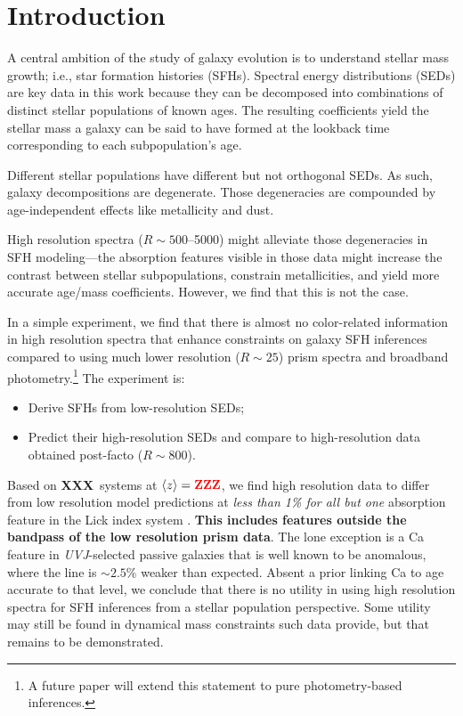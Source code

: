\documentclass[a4paper,fleqn,usenatbib]{mnras}
\newcommand{\bfr}{\bf\color{red}}
\newcommand{\ntot}{{\bfr XXX}} %
\newcommand{\midz}{{\bfr ZZZ}} %
\begin{document}

\section{Introduction}
\label{sec:intro}

A central ambition of the study of galaxy evolution is to understand stellar mass growth; i.e., 
star formation histories (SFHs). Spectral energy distributions (SEDs) are key data in this work because 
they can be decomposed into combinations of distinct stellar populations of known ages. The resulting 
coefficients yield the stellar mass a galaxy can be said to have formed at the lookback time 
corresponding to each subpopulation's age.
	
Different stellar populations have different but not orthogonal SEDs. As such, galaxy decompositions 
are degenerate. Those degeneracies are compounded by age-independent effects like metallicity 
and dust. 

High resolution spectra ($R\sim500$--5000) might alleviate those degeneracies 
in SFH modeling---the absorption features visible in those data might increase the contrast 
between stellar subpopulations, constrain metallicities, and yield more accurate 
age/mass coefficients. However, we find that this is not the case.

In a simple experiment, we find that there is almost no color-related information in high resolution 
spectra that enhance constraints on galaxy SFH inferences compared to using much lower
resolution ($R\sim25$) prism spectra and broadband photometry.\footnote{A future paper will 
extend this statement to pure photometry-based inferences.} The experiment is:
\begin{itemize}
	\item Derive SFHs from low-resolution SEDs;
	\item Predict their high-resolution SEDs and compare to high-resolution data obtained 
		post-facto ($R\sim800$).
\end{itemize}

Based on \ntot\ systems at $\langle z\rangle=\midz$, we find high resolution data to differ from 
low resolution model predictions at {\it less than 1\% for all but one} absorption feature in the 
Lick index system \citep{Worthey94}. {\bfr This includes features outside the bandpass of the 
low resolution prism data}. The lone exception is a Ca feature in {\it UVJ}-selected passive 
galaxies \citep{Williams09} that is well known to be anomalous, where the line is $\sim2.5\%$ 
weaker than expected. Absent a prior linking Ca to age accurate to that level, we conclude that there
is no utility in using high resolution spectra for SFH inferences from a stellar population perspective. 
Some utility may still be found in dynamical mass constraints such data provide, but that remains to be
demonstrated.
\end{document}
